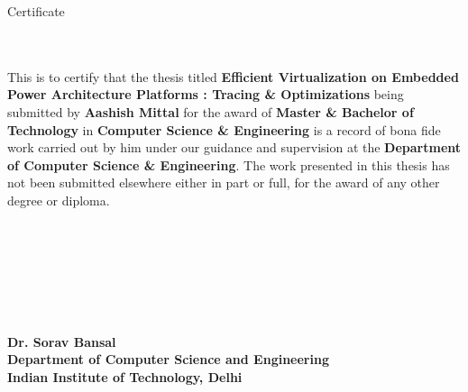 \begin{center}
\LARGE{ Certificate} 
\end{center}
\ \\ \ \\
This is to certify that the thesis titled {\bfseries Efficient Virtualization on Embedded Power Architecture\textsuperscript{\textregistered} Platforms : Tracing \& Optimizations} being submitted by {\bfseries Aashish Mittal} for the award of {\bfseries Master \& Bachelor of Technology} in {\bfseries Computer Science \& Engineering} is a record of bona fide work carried out by him under our guidance and supervision at the {\bfseries Department of Computer Science \& Engineering}. The work presented in this thesis has not been submitted elsewhere either in part or full, for the award of any other degree or diploma.\\
\\
\\
\\
\\
\\
\\
\\
{\bfseries Dr. Sorav Bansal} \\
{\bfseries Department of Computer Science and Engineering} \\
{\bfseries Indian Institute of Technology, Delhi}\\ 

